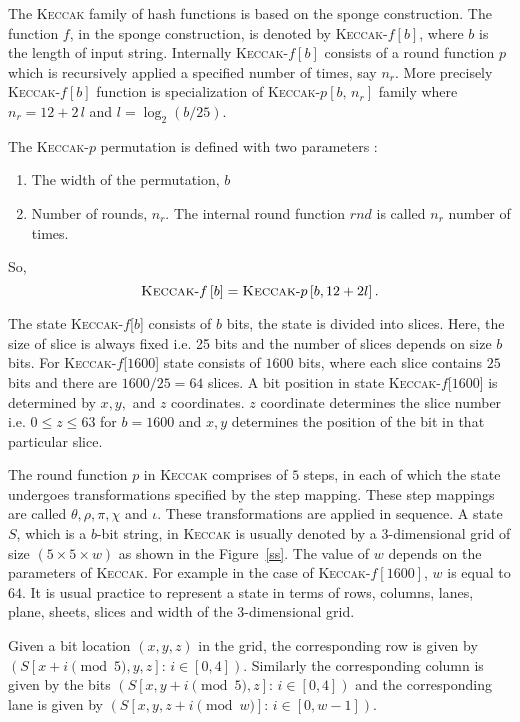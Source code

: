 \documentclass[runningheads]{llncs}
\newcommand{\KECCAK}{\mbox{\textsc{Keccak}}}
\newcommand{\Keccak}{\mbox{\textsc{Keccak}}}
\begin{document}
The \Keccak{} family of hash functions is based on the sponge construction. The function $f$, in the sponge construction, is denoted by \Keccak-$f\left[b\right]$, where $b$ is the length of input string. Internally \Keccak-$f\left[b\right]$ consists of a round function $p$ which is recursively applied a specified number of times, say $n_r$. More precisely \Keccak-$f\left[b\right]$ function is specialization of \Keccak-$p\left[b,\,n_r\right]$ family where $n_r = 12 + 2\,l$ and $l = \log_2 (b/25)$.

The \KECCAK-$p$ permutation is defined with two parameters : 
\begin{enumerate}
	\item The width of the permutation, $b$
	\item Number of rounds, $n_r$. The internal round function $rnd$ is called $n_r$ number of times.
\end{enumerate}

So,
\[
	\Keccak\text{-}f\left[b\right] = \Keccak\text{-}p\left[b,  12 + 2l\right].
\]

The state \KECCAK-$f$[$b$] consists of $b$ bits, the state is divided into slices. Here, the size of slice is always fixed i.e. 25 bits and the number of slices depends on size $b$ bits. For \KECCAK-$f$[$1600$] state consists of $1600$ bits, where each slice contains $25$ bits and there are $1600/25 = 64$ slices. A bit position in state \KECCAK-$f$[$1600$] is determined by $x, y, $ and $z$ coordinates. $z$ coordinate determines the slice number i.e. $0 \leq z \leq 63$ for $b = 1600$ and $x, y$ determines the position of the bit in that particular slice.

The round function $p$ in \Keccak{} comprises of $5$ steps, in each of which the state undergoes transformations specified by the step mapping. These step mappings are called $\theta, \rho, \pi, \chi$ and  $\iota$. These transformations are applied in sequence. A state $S$, which is a $b$-bit string, in \Keccak{} is usually denoted by a $3$-dimensional grid of size $(5 \times 5 \times w)$ as shown in the Figure~\ref{ss}. The value of $w$ depends on the parameters of \Keccak{}. For example in the case of \Keccak-$f\left[1600\right]$, $w$ is equal to $64$. It is usual practice to represent a state in terms of rows, columns, lanes, plane, sheets, slices and width of the $3$-dimensional grid.

Given a bit location $(x,y,z)$ in the grid, the corresponding row is given by $\left( S[x+i \pmod 5,y,z] : \, i \in [0,4] \right)$. Similarly the corresponding column is given by the bits $\left( S[x,y+i \pmod 5,z] : \, i \in [0,4] \right)$ and the corresponding lane is given by $\left( S[x,y,z+i \pmod w] : \, i \in [0,w-1] \right)$. 
\end{document}
